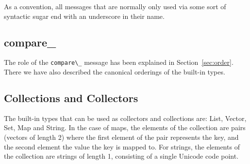 \documentclass[11pt]{amsart}
\newcommand{\babelsrc}[1] {\lstinline!#1!}
\begin{document}
As a convention, all messages that are normally only used via some sort of syntactic sugar end with an underscore in their name.

\subsection{compare\_}
The role of the \babelsrc{compare\_} message has been explained in Section~\ref{sec:order}. There we have also described the canonical orderings of the built-in types.

\subsection{Collections and Collectors}
The built-in types that can be used as collectors and collections are: List, Vector, Set, Map and String. In the case of maps,
the elements of the collection are pairs (vectors of length 2) where the first element of the pair represents the key, and the second element the value the key is mapped to. For strings, the elements of the collection are strings of length 1, consisting of a single Unicode code point. 
\end{document}
